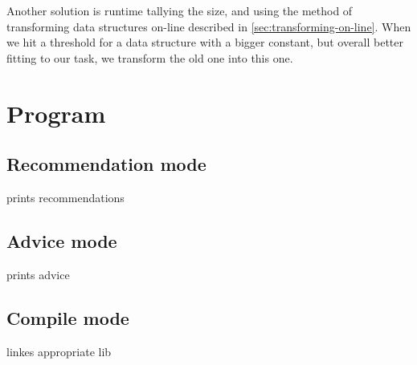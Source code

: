 \documentclass[11pt]{article}
\begin{document}
		Another solution is runtime tallying the size, and using the method of transforming data structures
		on-line described in \autoref{sec:transforming-on-line}. When we hit a threshold for a data structure
		with a bigger constant, but overall better fitting to our task, we transform the old one into this one.

\section{Program}

	\subsection{Recommendation mode}

		prints recommendations

	\subsection{Advice mode}

		prints advice

	\subsection{Compile mode}

		linkes appropriate lib
\end{document}
